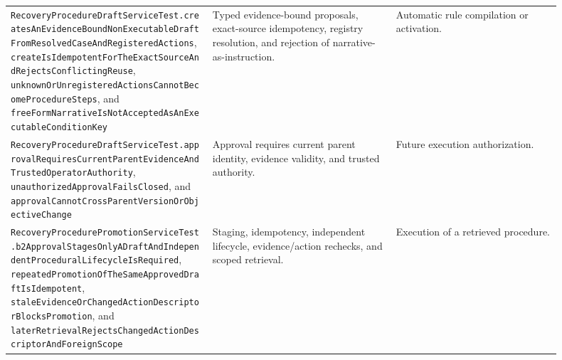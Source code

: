 \begin{longtable}{>{\raggedright\arraybackslash}p{0.33\linewidth} >{\raggedright\arraybackslash}p{0.30\linewidth} >{\raggedright\arraybackslash}p{0.27\linewidth}}
\texttt{Recovery\allowbreak Procedure\allowbreak Draft\allowbreak Service\allowbreak Test.\allowbreak creates\allowbreak An\allowbreak Evidence\allowbreak Bound\allowbreak Non\allowbreak Executable\allowbreak Draft\allowbreak From\allowbreak Resolved\allowbreak Case\allowbreak And\allowbreak Registered\allowbreak Actions}, \texttt{create\allowbreak Is\allowbreak Idempotent\allowbreak For\allowbreak The\allowbreak Exact\allowbreak Source\allowbreak And\allowbreak Rejects\allowbreak Conflicting\allowbreak Reuse}, \texttt{unknown\allowbreak Or\allowbreak Unregistered\allowbreak Actions\allowbreak Cannot\allowbreak Become\allowbreak Procedure\allowbreak Steps}, and \texttt{free\allowbreak Form\allowbreak Narrative\allowbreak Is\allowbreak Not\allowbreak Accepted\allowbreak As\allowbreak An\allowbreak Executable\allowbreak Condition\allowbreak Key} & Typed evidence-bound proposals, exact-source idempotency, registry resolution, and rejection of narrative-as-instruction. & Automatic rule compilation or activation. \\
\texttt{Recovery\allowbreak Procedure\allowbreak Draft\allowbreak Service\allowbreak Test.\allowbreak approval\allowbreak Requires\allowbreak Current\allowbreak Parent\allowbreak Evidence\allowbreak And\allowbreak Trusted\allowbreak Operator\allowbreak Authority}, \texttt{unauthorized\allowbreak Approval\allowbreak Fails\allowbreak Closed}, and \texttt{approval\allowbreak Cannot\allowbreak Cross\allowbreak Parent\allowbreak Version\allowbreak Or\allowbreak Objective\allowbreak Change} & Approval requires current parent identity, evidence validity, and trusted authority. & Future execution authorization. \\
\texttt{Recovery\allowbreak Procedure\allowbreak Promotion\allowbreak Service\allowbreak Test.\allowbreak b2\allowbreak Approval\allowbreak Stages\allowbreak Only\allowbreak ADraft\allowbreak And\allowbreak Independent\allowbreak Procedural\allowbreak Lifecycle\allowbreak Is\allowbreak Required}, \texttt{repeated\allowbreak Promotion\allowbreak Of\allowbreak The\allowbreak Same\allowbreak Approved\allowbreak Draft\allowbreak Is\allowbreak Idempotent}, \texttt{stale\allowbreak Evidence\allowbreak Or\allowbreak Changed\allowbreak Action\allowbreak Descriptor\allowbreak Blocks\allowbreak Promotion}, and \texttt{later\allowbreak Retrieval\allowbreak Rejects\allowbreak Changed\allowbreak Action\allowbreak Descriptor\allowbreak And\allowbreak Foreign\allowbreak Scope} & Staging, idempotency, independent lifecycle, evidence/action rechecks, and scoped retrieval. & Execution of a retrieved procedure. \\

\end{longtable}
